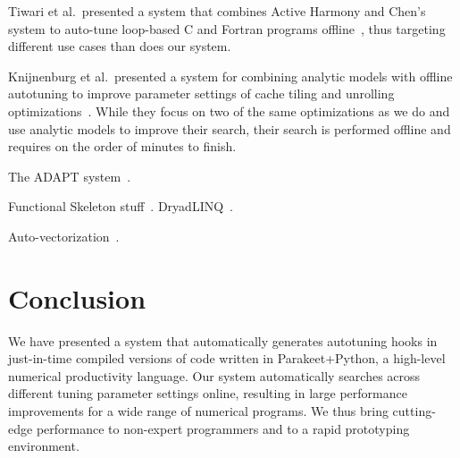 \documentclass[preprint,9pt]{sigplanconf}
\begin{document}
Tiwari et al.~presented a system that combines Active Harmony and Chen's system to auto-tune loop-based C and Fortran programs offline~\cite{Tiwa09}, thus targeting different use cases than does our system.

Knijnenburg et al.~presented a system for combining analytic models with offline autotuning to improve parameter settings of cache tiling and unrolling optimizations~\cite{Knij04}.  While they focus on two of the same optimizations as we do and use analytic models to improve their search, their search is performed offline and requires on the order of minutes to finish.

The ADAPT system~\cite{Voss99}.

Functional Skeleton stuff~\cite{Cole04, Darl95}.  DryadLINQ~\cite{Yu08, Yu09}.

Auto-vectorization~\cite{Kell12}.

\section{Conclusion}
\label{conclusion}
We have presented a system that automatically generates autotuning hooks in just-in-time compiled versions of code written in Parakeet+Python, a high-level numerical productivity language.  Our system automatically searches across different tuning parameter settings online, resulting in large performance improvements for a wide range of numerical programs.  We thus bring cutting-edge performance to non-expert programmers and to a rapid prototyping environment.






{}




\end{document}
